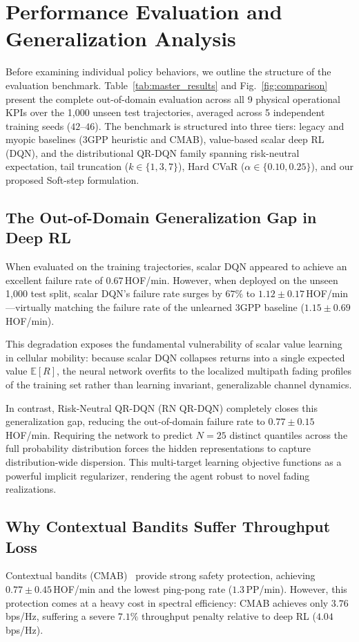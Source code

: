 \documentclass{ieeetmlcn}
\begin{document}
\section{Performance Evaluation and Generalization Analysis}
\label{sec:results}

Before examining individual policy behaviors, we outline the structure of the evaluation benchmark. Table~\ref{tab:master_results} and Fig.~\ref{fig:comparison} present the complete out-of-domain evaluation across all 9 physical operational KPIs over the 1,000 unseen test trajectories, averaged across 5 independent training seeds ($42$--$46$). The benchmark is structured into three tiers: legacy and myopic baselines (3GPP heuristic and CMAB), value-based scalar deep RL (DQN), and the distributional QR-DQN family spanning risk-neutral expectation, tail truncation ($k \in \{1, 3, 7\}$), Hard CVaR ($\alpha \in \{0.10, 0.25\}$), and our proposed Soft-step formulation.

\subsection{The Out-of-Domain Generalization Gap in Deep RL}
\label{sec:results-gap}
When evaluated on the training trajectories, scalar DQN appeared to achieve an excellent failure rate of $0.67$\,HOF/min. However, when deployed on the unseen 1,000 test split, scalar DQN's failure rate surges by $67\%$ to $1.12 \pm 0.17$\,HOF/min---virtually matching the failure rate of the unlearned 3GPP baseline ($1.15 \pm 0.69$\,HOF/min).

This degradation exposes the fundamental vulnerability of scalar value learning in cellular mobility: because scalar DQN collapses returns into a single expected value $\mathbb{E}[R]$, the neural network overfits to the localized multipath fading profiles of the training set rather than learning invariant, generalizable channel dynamics.

In contrast, Risk-Neutral QR-DQN (RN QR-DQN) completely closes this generalization gap, reducing the out-of-domain failure rate to $0.77 \pm 0.15$\,HOF/min. Requiring the network to predict $N=25$ distinct quantiles across the full probability distribution forces the hidden representations to capture distribution-wide dispersion. This multi-target learning objective functions as a powerful implicit regularizer, rendering the agent robust to novel fading realizations.

\subsection{Why Contextual Bandits Suffer Throughput Loss}
\label{sec:results-cmab}
Contextual bandits (CMAB)~\cite{cmab_ho} provide strong safety protection, achieving $0.77 \pm 0.45$\,HOF/min and the lowest ping-pong rate ($1.3$\,PP/min). However, this protection comes at a heavy cost in spectral efficiency: CMAB achieves only $3.76$\,bps/Hz, suffering a severe $7.1\%$ throughput penalty relative to deep RL ($4.04$\,bps/Hz).
\end{document}
